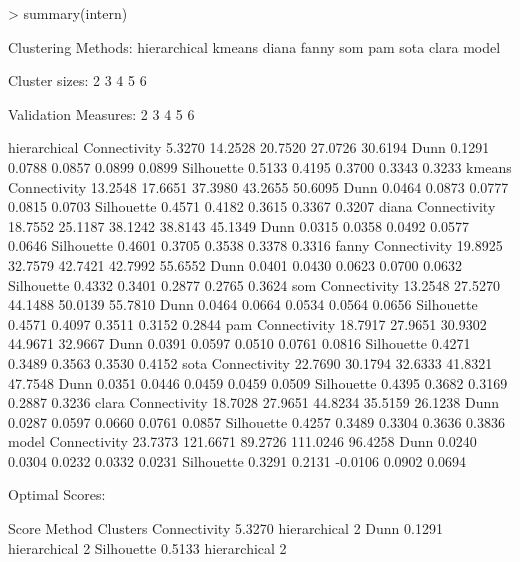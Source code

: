 \documentclass[11pt]{article}
\begin{document}
\begin{Schunk}
\begin{Sinput}
> summary(intern)
\end{Sinput}
\begin{Soutput}
Clustering Methods:
 hierarchical kmeans diana fanny som pam sota clara model 

Cluster sizes:
 2 3 4 5 6 

Validation Measures:
                                  2        3        4        5        6
                                                                       
hierarchical Connectivity    5.3270  14.2528  20.7520  27.0726  30.6194
             Dunn            0.1291   0.0788   0.0857   0.0899   0.0899
             Silhouette      0.5133   0.4195   0.3700   0.3343   0.3233
kmeans       Connectivity   13.2548  17.6651  37.3980  43.2655  50.6095
             Dunn            0.0464   0.0873   0.0777   0.0815   0.0703
             Silhouette      0.4571   0.4182   0.3615   0.3367   0.3207
diana        Connectivity   18.7552  25.1187  38.1242  38.8143  45.1349
             Dunn            0.0315   0.0358   0.0492   0.0577   0.0646
             Silhouette      0.4601   0.3705   0.3538   0.3378   0.3316
fanny        Connectivity   19.8925  32.7579  42.7421  42.7992  55.6552
             Dunn            0.0401   0.0430   0.0623   0.0700   0.0632
             Silhouette      0.4332   0.3401   0.2877   0.2765   0.3624
som          Connectivity   13.2548  27.5270  44.1488  50.0139  55.7810
             Dunn            0.0464   0.0664   0.0534   0.0564   0.0656
             Silhouette      0.4571   0.4097   0.3511   0.3152   0.2844
pam          Connectivity   18.7917  27.9651  30.9302  44.9671  32.9667
             Dunn            0.0391   0.0597   0.0510   0.0761   0.0816
             Silhouette      0.4271   0.3489   0.3563   0.3530   0.4152
sota         Connectivity   22.7690  30.1794  32.6333  41.8321  47.7548
             Dunn            0.0351   0.0446   0.0459   0.0459   0.0509
             Silhouette      0.4395   0.3682   0.3169   0.2887   0.3236
clara        Connectivity   18.7028  27.9651  44.8234  35.5159  26.1238
             Dunn            0.0287   0.0597   0.0660   0.0761   0.0857
             Silhouette      0.4257   0.3489   0.3304   0.3636   0.3836
model        Connectivity   23.7373 121.6671  89.2726 111.0246  96.4258
             Dunn            0.0240   0.0304   0.0232   0.0332   0.0231
             Silhouette      0.3291   0.2131  -0.0106   0.0902   0.0694

Optimal Scores:

             Score  Method       Clusters
Connectivity 5.3270 hierarchical 2       
Dunn         0.1291 hierarchical 2       
Silhouette   0.5133 hierarchical 2       
\end{Soutput}
\end{Schunk}
\end{document}
